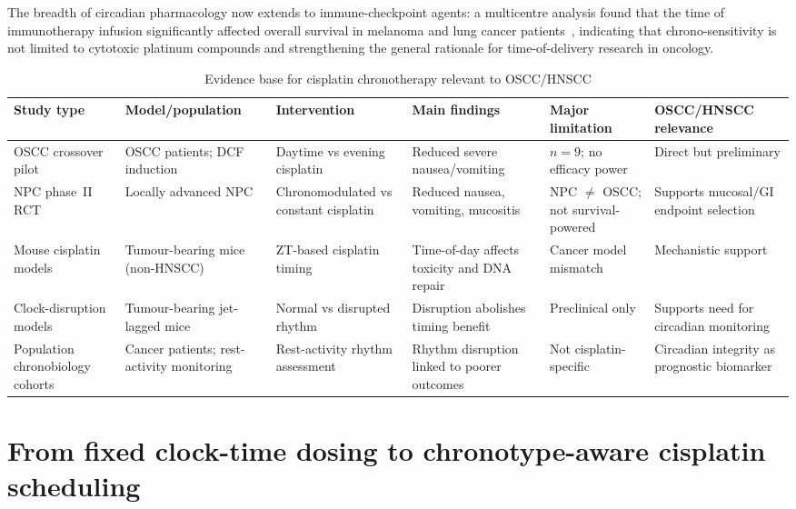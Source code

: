 \documentclass[preprint,review,12pt]{elsarticle}
\begin{document}
The breadth of circadian pharmacology now extends to immune-checkpoint
agents: a multicentre analysis found that the time of immunotherapy infusion
significantly affected overall survival in melanoma and lung cancer
patients~\cite{Qian2021}, indicating that chrono-sensitivity is not
limited to cytotoxic platinum compounds and strengthening the general
rationale for time-of-delivery research in oncology.

\begin{table}
\centering
\caption{Evidence base for cisplatin chronotherapy relevant to OSCC/HNSCC}
\label{tab:evidence}
\small
\begin{tabularx}{\linewidth}{L{2.6cm} Y Y Y Y Y}
\toprule
\textbf{Study type} & \textbf{Model/population} & \textbf{Intervention} &
  \textbf{Main findings} & \textbf{Major limitation} &
  \textbf{OSCC/HNSCC relevance} \\
\midrule
OSCC crossover pilot &
  OSCC patients; DCF induction &
  Daytime vs evening cisplatin &
  Reduced severe nausea/vomiting &
  $n=9$; no efficacy power &
  Direct but preliminary \\
\addlinespace
NPC phase~II RCT &
  Locally advanced NPC &
  Chronomodulated vs constant cisplatin &
  Reduced nausea, vomiting, mucositis &
  NPC $\neq$ OSCC; not survival-powered &
  Supports mucosal/GI endpoint selection \\
\addlinespace
Mouse cisplatin models &
  Tumour-bearing mice (non-HNSCC) &
  ZT-based cisplatin timing &
  Time-of-day affects toxicity and DNA repair &
  Cancer model mismatch &
  Mechanistic support \\
\addlinespace
Clock-disruption models &
  Tumour-bearing jet-lagged mice &
  Normal vs disrupted rhythm &
  Disruption abolishes timing benefit &
  Preclinical only &
  Supports need for circadian monitoring \\
\addlinespace
Population chronobiology cohorts &
  Cancer patients; rest-activity monitoring &
  Rest-activity rhythm assessment &
  Rhythm disruption linked to poorer outcomes &
  Not cisplatin-specific &
  Circadian integrity as prognostic biomarker \\
\bottomrule
\end{tabularx}
\end{table}


\section{From fixed clock-time dosing to chronotype-aware cisplatin scheduling}
\label{sec:future}
\end{document}
